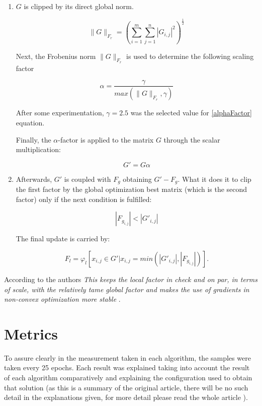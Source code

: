 \documentclass[10pt]{article}
\begin{document}
\begin{enumerate}
 \item $G$ is clipped by its direct global norm.

  \begin{equation}
  \|G\|_F_r = (\sum_{i=1}^m \sum_{j=1}^n |G_{i,j}|^2)^\frac{1}{2}
  \end{equation}

  Next, the Frobenius norm $\|G\|_F_r$ is used to determine the following scaling
  factor

  \begin{equation}
  \alpha = \frac{\gamma}{max(\|G\|_F_r, \gamma)}
  \label{alphaFactor}
  \end{equation}

  After some experimentation, $\gamma = 2.5$ was the selected value for 
  \hyperref[alphaFactor]{\ref{alphaFactor}} equation.

  Finally, the $\alpha$-factor is applied to the matrix $G$ through the scalar
  multiplication:

  \begin{equation}
  G' = G \alpha
  \end{equation}

 \item Afterwards, $G'$ is coupled with $F_g$ obtaining $G' - F_g$. What it does
 it to clip the first factor by the global optimization best matrix (which is
 the second factor) only if the next condition is fulfilled:
  
  \begin{equation}
  |F_g_{i,j}| < |G'_{i,j}|
  \end{equation}

  The final update is carried by:
  
  \begin{equation}
  F_l = \varphi_l [x_{i,j} \in G' | x_{i,j} = min(|G'_{i,j}|, |F_g_{i,j}|)].
  \end{equation}
\end{enumerate}

According to the authors \textit{This keeps the local factor in check and on
par, in terms of scale, with the relatively tame global factor and makes the use
of gradients in non-convex optimization more stable} \cite{artgpo}.

\section{Metrics}

To assure clearly in the measurement taken in each algorithm, the samples were
taken every 25 epochs. Each result was explained taking into account the result
of each algorithm comparatively and explaining the configuration used to obtain
that solution (as this is a summary of the original article, there will be no
such detail in the explanations given, for more detail please read the whole
article \cite{artgpo}).
\end{document}
